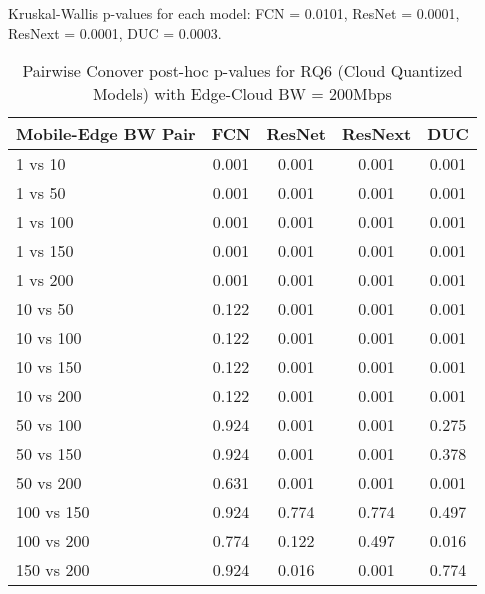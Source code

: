 \begin{table}[h]
\centering
\caption{Pairwise Conover post-hoc p-values for RQ6 (Cloud Quantized Models) with Edge-Cloud BW = 200Mbps}
\label{tab:conover_cloud_quantized_ec200}
\smallskip
Kruskal-Wallis p-values for each model: FCN = 0.0101, ResNet = 0.0001, ResNext = 0.0001, DUC = 0.0003.

\begin{tabular}{lcccc}
\toprule
Mobile-Edge BW Pair & FCN & ResNet & ResNext & DUC \\
\midrule
1 vs 10 & 0.001 & 0.001 & 0.001 & 0.001 \\
1 vs 50 & 0.001 & 0.001 & 0.001 & 0.001 \\
1 vs 100 & 0.001 & 0.001 & 0.001 & 0.001 \\
1 vs 150 & 0.001 & 0.001 & 0.001 & 0.001 \\
1 vs 200 & 0.001 & 0.001 & 0.001 & 0.001 \\
10 vs 50 & 0.122 & 0.001 & 0.001 & 0.001 \\
10 vs 100 & 0.122 & 0.001 & 0.001 & 0.001 \\
10 vs 150 & 0.122 & 0.001 & 0.001 & 0.001 \\
10 vs 200 & 0.122 & 0.001 & 0.001 & 0.001 \\
50 vs 100 & 0.924 & 0.001 & 0.001 & 0.275 \\
50 vs 150 & 0.924 & 0.001 & 0.001 & 0.378 \\
50 vs 200 & 0.631 & 0.001 & 0.001 & 0.001 \\
100 vs 150 & 0.924 & 0.774 & 0.774 & 0.497 \\
100 vs 200 & 0.774 & 0.122 & 0.497 & 0.016 \\
150 vs 200 & 0.924 & 0.016 & 0.001 & 0.774 \\
\bottomrule
\end{tabular}
\end{table}

